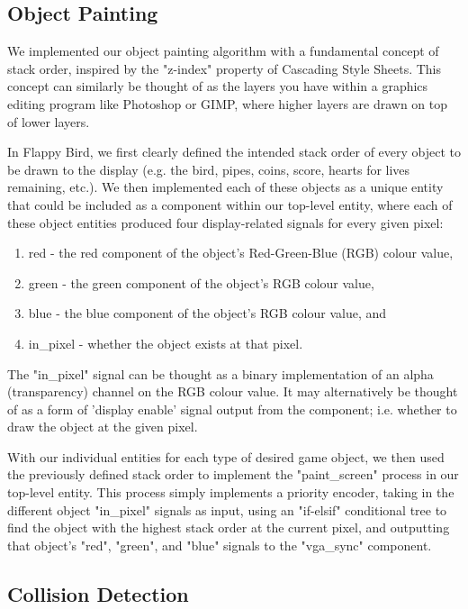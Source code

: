 \documentclass[conference]{IEEEtran}
\begin{document}
\subsection{Object Painting}
We implemented our object painting algorithm with a fundamental concept of stack order, inspired by the "z-index" property of Cascading Style Sheets. This concept can similarly be thought of as the layers you have within a graphics editing program like Photoshop or GIMP, where higher layers are drawn on top of lower layers.

In Flappy Bird, we first clearly defined the intended stack order of every object to be drawn to the display (e.g. the bird, pipes, coins, score, hearts for lives remaining, etc.). We then implemented each of these objects as a unique entity that could be included as a component within our top-level entity, where each of these object entities produced four display-related signals for every given pixel:
\begin{enumerate}
    \item red - the red component of the object's Red-Green-Blue (RGB) colour value,
    \item green - the green component of the object's RGB colour value,
    \item blue - the blue component of the object's RGB colour value, and
    \item in\_pixel - whether the object exists at that pixel.
\end{enumerate}

The "in\_pixel" signal can be thought as a binary implementation of an alpha (transparency) channel on the RGB colour value. It may alternatively be thought of as a form of 'display enable' signal output from the component; i.e. whether to draw the object at the given pixel.

With our individual entities for each type of desired game object, we then used the previously defined stack order to implement the "paint\_screen" process in our top-level entity. This process simply implements a priority encoder, taking in the different object "in\_pixel" signals as input, using an "if-elsif" conditional tree to find the object with the highest stack order at the current pixel, and outputting that object's "red", "green", and "blue" signals to the "vga\_sync" component.

\subsection{Collision Detection}
\end{document}
